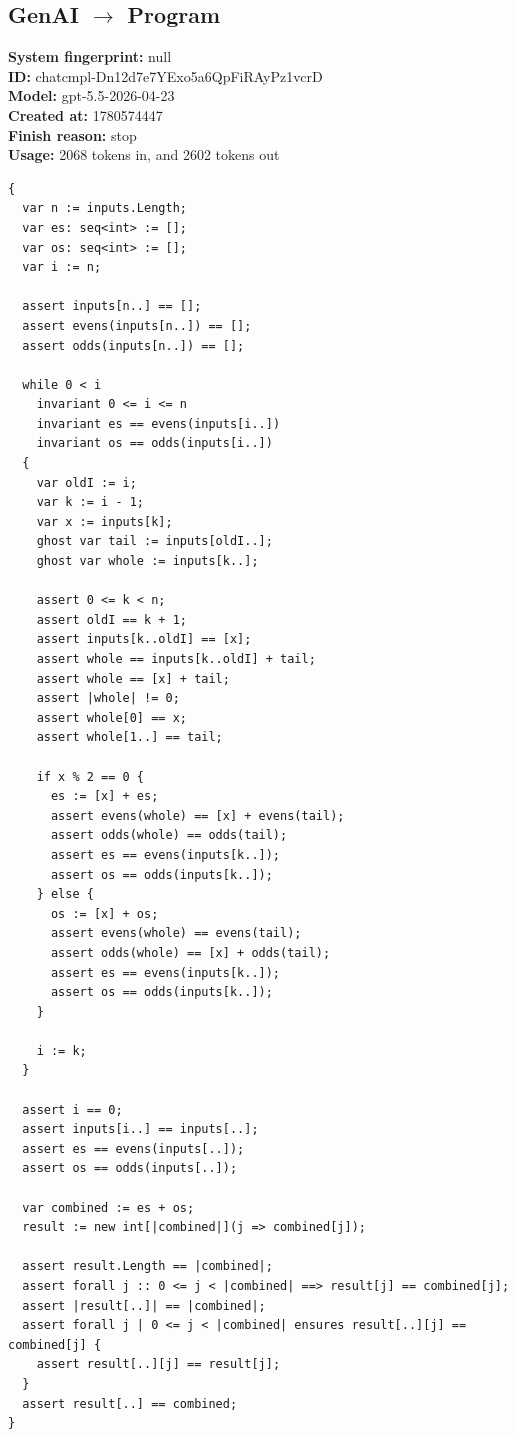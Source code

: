 \documentclass{article}
\begin{document}
\subsection*{GenAI $\rightarrow$ Program}
\textbf{System fingerprint: }null
\\\textbf{ID: }chatcmpl-Dn12d7e7YExo5a6QpFiRAyPz1vcrD
\\\textbf{Model: }gpt-5.5-2026-04-23
\\\textbf{Created at: }1780574447
\\\textbf{Finish reason: }stop
\\\textbf{Usage: }2068 tokens in, and 2602 tokens out
\begin{lstlisting}
{
  var n := inputs.Length;
  var es: seq<int> := [];
  var os: seq<int> := [];
  var i := n;

  assert inputs[n..] == [];
  assert evens(inputs[n..]) == [];
  assert odds(inputs[n..]) == [];

  while 0 < i
    invariant 0 <= i <= n
    invariant es == evens(inputs[i..])
    invariant os == odds(inputs[i..])
  {
    var oldI := i;
    var k := i - 1;
    var x := inputs[k];
    ghost var tail := inputs[oldI..];
    ghost var whole := inputs[k..];

    assert 0 <= k < n;
    assert oldI == k + 1;
    assert inputs[k..oldI] == [x];
    assert whole == inputs[k..oldI] + tail;
    assert whole == [x] + tail;
    assert |whole| != 0;
    assert whole[0] == x;
    assert whole[1..] == tail;

    if x % 2 == 0 {
      es := [x] + es;
      assert evens(whole) == [x] + evens(tail);
      assert odds(whole) == odds(tail);
      assert es == evens(inputs[k..]);
      assert os == odds(inputs[k..]);
    } else {
      os := [x] + os;
      assert evens(whole) == evens(tail);
      assert odds(whole) == [x] + odds(tail);
      assert es == evens(inputs[k..]);
      assert os == odds(inputs[k..]);
    }

    i := k;
  }

  assert i == 0;
  assert inputs[i..] == inputs[..];
  assert es == evens(inputs[..]);
  assert os == odds(inputs[..]);

  var combined := es + os;
  result := new int[|combined|](j => combined[j]);

  assert result.Length == |combined|;
  assert forall j :: 0 <= j < |combined| ==> result[j] == combined[j];
  assert |result[..]| == |combined|;
  assert forall j | 0 <= j < |combined| ensures result[..][j] == combined[j] {
    assert result[..][j] == result[j];
  }
  assert result[..] == combined;
}
\end{lstlisting}
\end{document}
